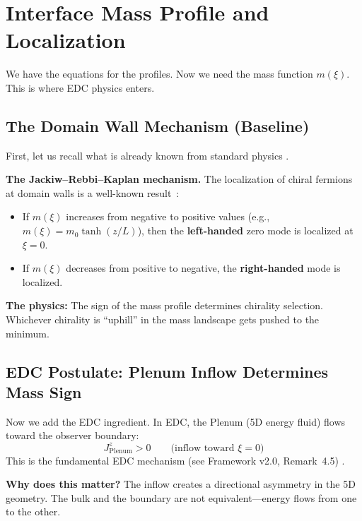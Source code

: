 \section{Interface Mass Profile and Localization}
\label{sec:ch9_localization}

We have the equations for the profiles. Now we need the mass function $m(\xi)$.
This is where EDC physics enters.

\subsection{The Domain Wall Mechanism (Baseline)}

First, let us recall what is already known from standard physics \tagBL{}.

\textbf{The Jackiw--Rebbi--Kaplan mechanism.} The localization of chiral fermions
at domain walls is a well-known result~\cite{JackiwRebbi1976,Kaplan1992}:
\begin{itemize}[nosep]
    \item If $m(\xi)$ increases from negative to positive values (e.g., $m(\xi) = m_0 \tanh(z/L)$),
          then the \textbf{left-handed} zero mode is localized at $\xi = 0$.
    \item If $m(\xi)$ decreases from positive to negative, the \textbf{right-handed}
          mode is localized.
\end{itemize}

\textbf{The physics:} The sign of the mass profile determines chirality selection.
Whichever chirality is ``uphill'' in the mass landscape gets pushed to the minimum.

\subsection{EDC Postulate: Plenum Inflow Determines Mass Sign}

Now we add the EDC ingredient. In EDC, the Plenum (5D energy fluid) flows toward
the observer boundary:
\begin{equation}
    J^z_{\text{Plenum}} > 0 \qquad \text{(inflow toward $\xi = 0$)}
    \label{eq:ch9_inflow}
\end{equation}
This is the fundamental EDC mechanism (see Framework v2.0, Remark~4.5) \tagP{}.

\textbf{Why does this matter?} The inflow creates a directional asymmetry in
the 5D geometry. The bulk and the boundary are not equivalent---energy flows
from one to the other.

